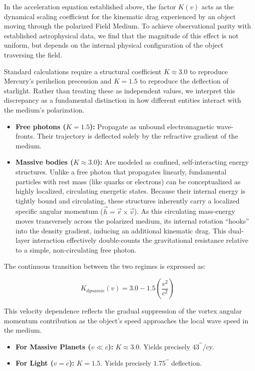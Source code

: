 \documentclass[
]{article}
\providecommand{\tightlist}{%
  \setlength{\itemsep}{0pt}\setlength{\parskip}{0pt}}
\begin{document}
In the acceleration equation established above, the factor \(K(v)\) acts
as the dynamical scaling coefficient for the kinematic drag experienced
by an object moving through the polarized Field Medium. To achieve
observational parity with established astrophysical data, we find that
the magnitude of this effect is not uniform, but depends on the internal
physical configuration of the object traversing the field.

Standard calculations require a structural coefficient \(K \approx 3.0\)
to reproduce Mercury's perihelion precession and \(K = 1.5\) to
reproduce the deflection of starlight. Rather than treating these as
independent values, we interpret this discrepancy as a fundamental
distinction in how different entities interact with the medium's
polarization.

\begin{itemize}
\tightlist
\item
  \textbf{Free photons (\(K = 1.5\)):} Propagate as unbound
  electromagnetic wave-fronts. Their trajectory is deflected solely by
  the refractive gradient of the medium.
\item
  \textbf{Massive bodies (\(K \approx 3.0\)):} Are modeled as confined,
  self-interacting energy structures. Unlike a free photon that
  propagates linearly, fundamental particles with rest mass (like quarks
  or electrons) can be conceptualized as highly localized, circulating
  energetic states. Because their internal energy is tightly bound and
  circulating, these structures inherently carry a localized specific
  angular momentum (\(\vec{h} = \vec{r} \times \vec{v}\)). As this
  circulating mass-energy moves transversely across the polarized
  medium, its internal rotation ``hooks'' into the density gradient,
  inducing an additional kinematic drag. This dual-layer interaction
  effectively double-counts the gravitational resistance relative to a
  simple, non-circulating free photon.
\end{itemize}

The continuous transition between the two regimes is expressed as:

\[K_{dynamic}(v) = 3.0 - 1.5 \left( \frac{v^2}{c^2} \right)\]

This velocity dependence reflects the gradual suppression of the vortex
angular momentum contribution as the object's speed approaches the local
wave speed in the medium.

\begin{itemize}
\tightlist
\item
  \textbf{For Massive Planets (\(v \ll c\)):} \(K \approx 3.0\). Yields
  precisely \(43^{\prime\prime}\)/cy.
\item
  \textbf{For Light (\(v = c\)):} \(K = 1.5\). Yields precisely
  \(1.75^{\prime\prime}\) deflection.
\end{itemize}
\end{document}
